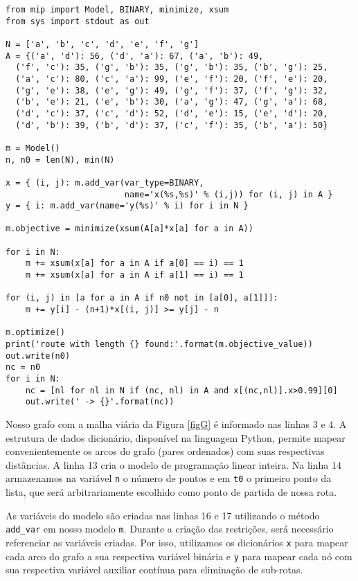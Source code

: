\documentclass[a4paper,11pt,fleqn]{article}
\begin{document}
{\small
\begin{lstlisting}
from mip import Model, BINARY, minimize, xsum
from sys import stdout as out

N = ['a', 'b', 'c', 'd', 'e', 'f', 'g']
A = {('a', 'd'): 56, ('d', 'a'): 67, ('a', 'b'): 49, 
  ('f', 'c'): 35, ('g', 'b'): 35, ('g', 'b'): 35, ('b', 'g'): 25,
  ('a', 'c'): 80, ('c', 'a'): 99, ('e', 'f'): 20, ('f', 'e'): 20,
  ('g', 'e'): 38, ('e', 'g'): 49, ('g', 'f'): 37, ('f', 'g'): 32,
  ('b', 'e'): 21, ('e', 'b'): 30, ('a', 'g'): 47, ('g', 'a'): 68,
  ('d', 'c'): 37, ('c', 'd'): 52, ('d', 'e'): 15, ('e', 'd'): 20,
  ('d', 'b'): 39, ('b', 'd'): 37, ('c', 'f'): 35, ('b', 'a'): 50}
  
m = Model()
n, n0 = len(N), min(N)

x = { (i, j): m.add_var(var_type=BINARY, 
                        name='x(%s,%s)' % (i,j)) for (i, j) in A }
y = { i: m.add_var(name='y(%s)' % i) for i in N }

m.objective = minimize(xsum(A[a]*x[a] for a in A))

for i in N:
    m += xsum(x[a] for a in A if a[0] == i) == 1
    m += xsum(x[a] for a in A if a[1] == i) == 1
	
for (i, j) in [a for a in A if n0 not in [a[0], a[1]]]:
    m += y[i] - (n+1)*x[(i, j)] >= y[j] - n
	
m.optimize()
print('route with length {} found:'.format(m.objective_value))
out.write(n0)
nc = n0
for i in N:
    nc = [nl for nl in N if (nc, nl) in A and x[(nc,nl)].x>0.99][0]
    out.write(' -> {}'.format(nc))
\end{lstlisting}
}

Nosso grafo com a malha viária da Figura \ref{figG} é informado nas linhas 3 e 4. A estrutura de dados dicionário, disponível na linguagem Python, permite mapear convenientemente os arcos do grafo (pares ordenados) com suas respectivas distâncias. A linha 13 cria o modelo de programação linear inteira. Na linha 14 armazenamos na variável \texttt{n} o número de pontos e em \texttt{t0} o primeiro ponto da lista, que será arbitrariamente escolhido como ponto de partida de nossa rota. 

As variáveis do modelo são criadas nas linhas 16 e 17 utilizando o método \texttt{add\_var} em nosso modelo \texttt{m}. Durante a criação das restrições, será necessário referenciar as variáveis criadas. Por isso, utilizamos os dicionários \texttt{x} para mapear cada arco do grafo a sua respectiva variável binária e \texttt{y} para mapear cada nó com sua respectiva variável auxiliar contínua para eliminação de sub-rotas.
\end{document}
